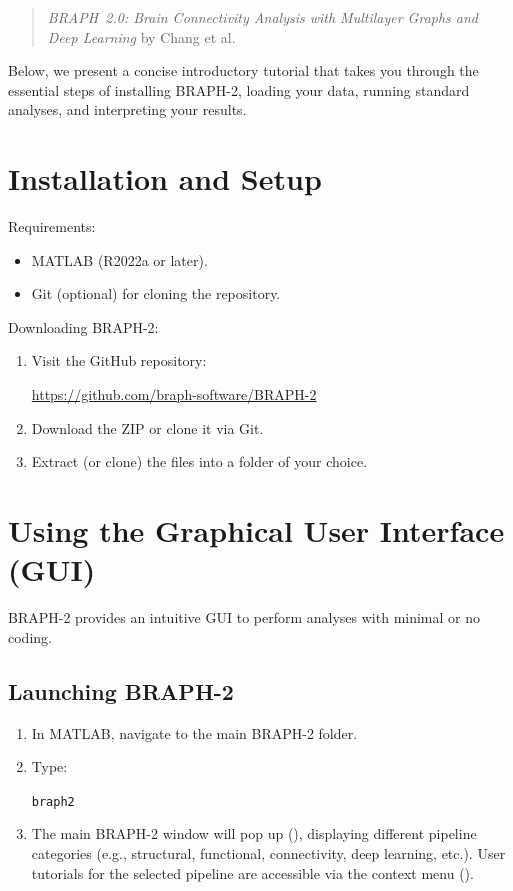 \documentclass[justified]{tufte-handout}
\begin{document}
\begin{quote}
\emph{BRAPH~2.0: Brain Connectivity Analysis with Multilayer Graphs and Deep Learning} by Chang et al.
\end{quote}

Below, we present a concise introductory tutorial that takes you through the essential steps of installing BRAPH-2, loading your data, running standard analyses, and interpreting your results.

\section{Installation and Setup}

Requirements:
\begin{itemize}

\item MATLAB (R2022a or later).

\item Git (optional) for cloning the repository.

\end{itemize}

Downloading BRAPH-2:
\begin{enumerate}

\item Visit the GitHub repository:

\url{https://github.com/braph-software/BRAPH-2}

\item Download the ZIP or clone it via Git.

\item Extract (or clone) the files into a folder of your choice.

\end{enumerate}

\section{Using the Graphical User Interface (GUI)}

BRAPH-2 provides an intuitive GUI to perform analyses with minimal or no coding.

\subsection{Launching BRAPH-2}

\begin{enumerate}

\item In MATLAB, navigate to the main BRAPH-2 folder.

\item Type:

\lstinline{braph2}

\item The main BRAPH-2 window will pop up (), displaying different pipeline categories (e.g., structural, functional, connectivity, deep learning, etc.). User tutorials for the selected pipeline are accessible via the context menu ().

\end{enumerate}
\end{document}

